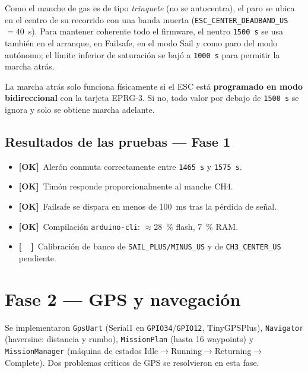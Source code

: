 \documentclass[12pt,a4paper]{article}
\newcommand{\gpio}[1]{\texttt{GPIO#1}}
\newcommand{\us}[1]{\texttt{#1\,\textmu s}}
\newcommand{\file}[1]{\texttt{#1}}
\newcommand{\done}{\textcolor{okborder}{\textbf{[OK]}}}
\newcommand{\todo}{\textcolor{warnborder}{\textbf{[\ \ ]}}}
\begin{document}
Como el manche de gas es de tipo \emph{trinquete} (no se autocentra), el paro se
ubica en el centro de su recorrido con una banda muerta
(\texttt{ESC\_CENTER\_DEADBAND\_US} $=40$~\textmu s). Para mantener coherente todo el
firmware, el neutro \us{1500} se usa tambi\'en en el arranque, en Failsafe, en el
modo Sail y como paro del modo aut\'onomo; el l\'imite inferior de saturaci\'on se
baj\'o a \us{1000} para permitir la marcha atr\'as.

\begin{warningbox}
  La marcha atr\'as solo funciona f\'isicamente si el ESC est\'a \textbf{programado
  en modo bidireccional} con la tarjeta EPRG-3. Si no, todo valor por debajo de
  \us{1500} se ignora y solo se obtiene marcha adelante.
\end{warningbox}

\subsection{Resultados de las pruebas --- Fase 1}

\begin{itemize}
  \item \done\ Aler\'on conmuta correctamente entre \us{1465} y \us{1575}.
  \item \done\ Tim\'on responde proporcionalmente al manche CH4.
  \item \done\ Failsafe se dispara en menos de 100~ms tras la p\'erdida de se\~nal.
  \item \done\ Compilaci\'on \texttt{arduino-cli}: $\approx$28~\% flash, 7~\% RAM.
  \item \todo\ Calibraci\'on de banco de \texttt{SAIL\_PLUS/MINUS\_US} y de
    \texttt{CH3\_CENTER\_US} pendiente.
\end{itemize}

\section{Fase 2 --- GPS y navegaci\'on}

Se implementaron \file{GpsUart} (Serial1 en \gpio{34}/\gpio{12}, TinyGPSPlus),
\file{Navigator} (haversine: distancia y rumbo), \file{MissionPlan} (hasta 16
waypoints) y \file{MissionManager} (m\'aquina de estados
Idle$\to$Running$\to$Returning$\to$Complete). Dos problemas cr\'iticos de GPS se
resolvieron en esta fase.
\end{document}

